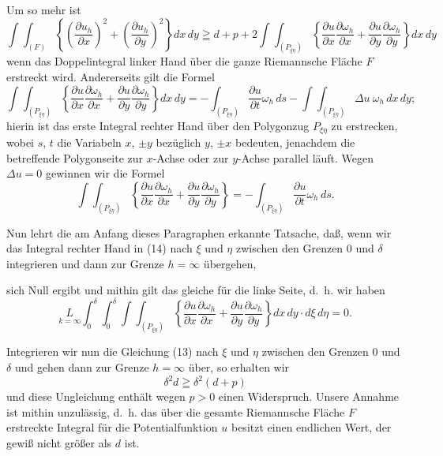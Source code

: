\documentclass{article}
\begin{document}
Um so mehr ist
\[
\tag{13}
\int\!\!\int_{(F)} \left\{ \left(\frac{\partial u_h}{\partial x}\right)^2 + \left(\frac{\partial u_h}{\partial y}\right)^2 \right\} dx\,dy \geqq d + p + 2 \int\!\!\int_{(P_{\xi\eta})} \left\{ \frac{\partial u}{\partial x} \frac{\partial \omega_h}{\partial x} + \frac{\partial u}{\partial y} \frac{\partial \omega_h}{\partial y} \right\} dx\,dy
\]
wenn das Doppelintegral linker Hand über die ganze Riemannsche Fläche $F$ erstreckt wird. Andererseits gilt die Formel
\[
\int\!\!\int_{(P_{\xi\eta})} \left\{ \frac{\partial u}{\partial x} \frac{\partial \omega_h}{\partial x} + \frac{\partial u}{\partial y} \frac{\partial \omega_h}{\partial y} \right\} dx\,dy = - \int_{(P_{\xi\eta})} \frac{\partial u}{\partial t} \omega_h\,ds - \int\!\!\int_{(P_{\xi\eta})} \Delta u\ \omega_h\,dx\,dy;
\]
hierin ist das erste Integral rechter Hand über den Polygonzug $P_{\xi\eta}$ zu erstrecken, wobei $s$, $t$ die Variabeln $x$, $\pm y$ bezüglich $y$, $\pm x$ bedeuten, jenachdem die betreffende Polygonseite zur $x$-Achse oder zur $y$-Achse parallel läuft. Wegen $\Delta u = 0$ gewinnen wir die Formel
\[
\tag{14}
\int\!\!\int_{(P_{\xi\eta})} \left\{ \frac{\partial u}{\partial x} \frac{\partial \omega_h}{\partial x} + \frac{\partial u}{\partial y} \frac{\partial \omega_h}{\partial y} \right\} = - \int_{(P_{\xi\eta})} \frac{\partial u}{\partial t} \omega_h\,ds.
\]

Nun lehrt die am Anfang dieses Paragraphen erkannte Tatsache, daß, wenn wir das Integral rechter Hand in (14) nach $\xi$ und $\eta$ zwischen den Grenzen 0 und $\delta$ integrieren und dann zur Grenze $h = \infty$ übergehen,

sich Null ergibt und mithin gilt das gleiche für die linke Seite, d.~h. wir haben
\[
\underset{k=\infty}{L} \int_0^\delta \int_0^\delta \int\!\!\int_{(P_{\xi\eta})} \left\{ \frac{\partial u}{\partial x} \frac{\partial \omega_h}{\partial x} + \frac{\partial u}{\partial y} \frac{\partial \omega_h}{\partial y} \right\} dx\,dy \cdot d\xi\,d\eta = 0.
\]

Integrieren wir nun die Gleichung (13) nach $\xi$ und $\eta$ zwischen den Grenzen 0 und $\delta$ und gehen dann zur Grenze $h = \infty$ über, so erhalten wir
\[
\delta^2 d \geqq \delta^2 (d + p)
\]
und diese Ungleichung enthält wegen $p > 0$ einen Widerspruch. Unsere Annahme ist mithin unzulässig, d.~h. das über die gesamte Riemannsche Fläche $F$ erstreckte Integral für die Potentialfunktion $u$ besitzt einen endlichen Wert, der gewiß nicht größer als $d$ ist.
\end{document}

